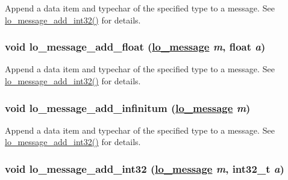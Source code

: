 Append a data item and typechar of the specified type to a message. See \hyperlink{group__liblolowlevel_g31ac1e4c0ec6c61f665ce3f9bbdc53c3}{lo\_\-message\_\-add\_\-int32()} for details. 

\hypertarget{group__liblolowlevel_g4704d1b80cb0fd005a1310f57ca46b00}{
\subsubsection[lo\_\-message\_\-add\_\-float]{\setlength{\rightskip}{0pt plus 5cm}void lo\_\-message\_\-add\_\-float (\hyperlink{lo__types_8h_d126083c98d941f00eb72d1690b38d63}{lo\_\-message} {\em m}, float {\em a})}}
\label{group__liblolowlevel_g4704d1b80cb0fd005a1310f57ca46b00}


Append a data item and typechar of the specified type to a message. See \hyperlink{group__liblolowlevel_g31ac1e4c0ec6c61f665ce3f9bbdc53c3}{lo\_\-message\_\-add\_\-int32()} for details. 

\hypertarget{group__liblolowlevel_g826a762ee506b7f95fd27aadae82d56d}{
\subsubsection[lo\_\-message\_\-add\_\-infinitum]{\setlength{\rightskip}{0pt plus 5cm}void lo\_\-message\_\-add\_\-infinitum (\hyperlink{lo__types_8h_d126083c98d941f00eb72d1690b38d63}{lo\_\-message} {\em m})}}
\label{group__liblolowlevel_g826a762ee506b7f95fd27aadae82d56d}


Append a data item and typechar of the specified type to a message. See \hyperlink{group__liblolowlevel_g31ac1e4c0ec6c61f665ce3f9bbdc53c3}{lo\_\-message\_\-add\_\-int32()} for details. 

\hypertarget{group__liblolowlevel_g31ac1e4c0ec6c61f665ce3f9bbdc53c3}{
\subsubsection[lo\_\-message\_\-add\_\-int32]{\setlength{\rightskip}{0pt plus 5cm}void lo\_\-message\_\-add\_\-int32 (\hyperlink{lo__types_8h_d126083c98d941f00eb72d1690b38d63}{lo\_\-message} {\em m}, int32\_\-t {\em a})}}
\label{group__liblolowlevel_g31ac1e4c0ec6c61f665ce3f9bbdc53c3}


